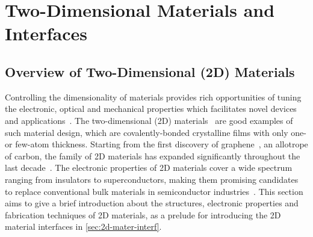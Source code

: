 \chapter{Two-Dimensional Materials and Interfaces}
\label{ch:introduction}
\renewcommand*\imgdir{img/intro/}

%

\vspace{1em}



\section{Overview of Two-Dimensional (2D) Materials}
\label{sec:ch-intro-2D}
Controlling the dimensionality of materials provides rich
opportunities of tuning the electronic, optical and mechanical
properties which facilitates novel devices and applications~\autocite{Davies_1997_book,Ihn_2009_book}.
%
The two-dimensional (2D)
materials~\autocite{Novoselov_2012_roadmap,Mas_Ballest_2011_review,Bhimanapati_2015_2D_rev,Butler_2013_review,Novoselov_2016_vdW,Mannix_2017}
are good examples of such material design, which are
covalently-bonded crystalline films with only one- or few-atom
thickness.
%
Starting from the first discovery of
graphene~\autocite{Novoselov_2004_gr}, an allotrope of carbon, the family
of 2D materials has expanded significantly throughout the last
decade~\autocite{Butler_2013_review,Das_2015_beyond_gr,Novoselov_2016_vdW}.
%
The electronic properties of 2D materials cover a wide spectrum
ranging from insulators to superconductors, making them promising
candidates to replace conventional bulk materials in semiconductor
industries~\autocite{Xia_2014_2D_nanophoto_rev,Bhimanapati_2015_2D_rev}.
%
This section aims to give a brief introduction about the structures,
electronic properties and fabrication techniques of 2D materials, as a
prelude for introducing the 2D material interfaces in
\autoref{sec:2d-mater-interf}.

